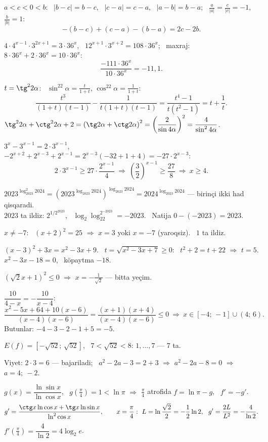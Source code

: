 $a<c<0<b$: \ $|b-c|=b-c$, \ $|c-a|=c-a$, \ $|a-b|=b-a$; \ $\frac a{|a|}=\frac c{|c|}=-1$, $\frac b{|b|}=1$:
\[-(b-c)+(c-a)-(b-a)=2c-2b.\]

$4\cdot4^{x-1}\cdot3^{2x+1}=3\cdot36^x$, \ $12^{x+1}\cdot3^{x+2}=108\cdot36^x$; \ maxraj: $8\cdot36^x+2\cdot36^x=10\cdot36^x$:
\[\frac{-111\cdot36^x}{10\cdot36^x}=-11{,}1.\]

$t=\tg^22\alpha$: \ $\sin^22\alpha=\frac t{1+t}$, $\cos^22\alpha=\frac1{1+t}$:
\[\frac{t^3}{(1+t)(t-1)}-\frac1{t(1+t)(t-1)}=\frac{t^4-1}{t\left(t^2-1\right)}=t+\frac1t.\]
$\tg^22\alpha+\ctg^22\alpha+2=\left(\tg2\alpha+\ctg2\alpha\right)^2=\left(\dfrac2{\sin4\alpha}\right)^2=\dfrac4{\sin^24\alpha}$.

$3^x-3^{x-1}=2\cdot3^{x-1}$, \ $-2^{x+2}+2^{x-3}+2^{x-1}=2^{x-3}(-32+1+4)=-27\cdot2^{x-3}$:
\[2\cdot3^{x-1}\ge27\cdot\frac{2^{x-1}}4\ \Rightarrow\ \left(\frac32\right)^{x-1}\ge\frac{27}8\ \Rightarrow\ x\ge4.\]

$2023^{\log^2_{2023}2024}=\left(2023^{\log_{2023}2024}\right)^{\log_{2023}2024}=2024^{\log_{2023}2024}$ — birinçi ikki had qisqaradi.\\
$2023$ ta ildiz: $2^{1/2^{2023}}$, \ $\log_2\log_22^{2^{-2023}}=-2023$. \ Natija $0-(-2023)=2023$.

$x\ne-7$: \ $(x+2)^2=25$ $\Rightarrow$ $x=3$ yoki $x=-7$ (yaroqsiz). \ $1$ ta ildiz.

$(x-3)^2+3x=x^2-3x+9$. \ $t=\sqrt{x^2-3x+7}\ge0$: \ $t^2+2=t+22$ $\Rightarrow$ $t=5$.\\
$x^2-3x-18=0$, \ köpaytma $-18$.

$\left(\sqrt2x+1\right)^2\le0$ $\Rightarrow$ $x=-\frac1{\sqrt2}$ — bitta yeçim.

$\dfrac{10}{4-x}=-\dfrac{10}{x-4}$:
\[\frac{x^2-5x+64+10(x-6)}{(x-4)(x-6)}=\frac{(x+1)(x+4)}{(x-4)(x-6)}\le0\ \Rightarrow\ x\in[-4;\,-1]\cup(4;\,6).\]
Butunlar: $-4-3-2-1+5=-5$.

$E(f)=\left[-\sqrt{52};\,\sqrt{52}\right]$, \ $7<\sqrt{52}<8$: $1,\dots,7$ — $7$ ta.

Viyet: $2\cdot3=6$ — bajariladi; \ $a^2-2a-3=2+3$ $\Rightarrow$ $a^2-2a-8=0$ $\Rightarrow$ $a=4;\ -2$.

$g(x)=\dfrac{\ln\sin x}{\ln\cos x}$, \ $g\left(\frac\pi4\right)=1<\ln\pi$ $\Rightarrow$ $\frac\pi4$ atrofida $f=\ln\pi-g$, \ $f'=-g'$.
\[g'=\frac{\ctg x\ln\cos x+\tg x\ln\sin x}{\ln^2\cos x},\qquad x=\frac\pi4:\ L=\ln\frac{\sqrt2}2=-\frac12\ln2,\ \ g'=\frac{2L}{L^2}=-\frac4{\ln2}.\]
$f'\left(\frac\pi4\right)=\dfrac4{\ln2}=4\log_2e$.

